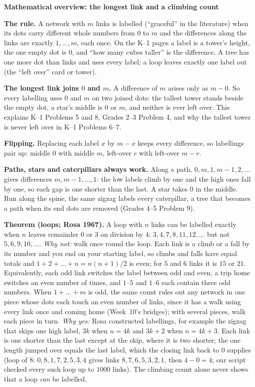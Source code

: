 \documentclass[11pt]{article}
\newcommand{\head}[1]{\par\textbf{\large #1}\par}
\begin{document}
\head{Mathematical overview: the longest link and a climbing count}
\textbf{The rule.} A network with $m$ links is labelled (``graceful'' in the literature) when its dots carry different whole numbers from $0$ to $m$ and the differences along the links are exactly $1,\dots,m$, each once. On the K--1 pages a label is a tower's height, the one empty dot is $0$, and ``how many cubes taller'' is the difference. A tree has one more dot than links and uses every label; a loop leaves exactly one label out (the ``left over'' card or tower).

\textbf{The longest link joins $0$ and $m$.} A difference of $m$ arises only as $m-0$. So every labelling uses $0$ and $m$ on two joined dots: the tallest tower stands beside the empty dot, a star's middle is $0$ or $m$, and neither is ever left over. This explains K--1 Problems 5 and 8, Grades 2--3 Problem 4, and why the tallest tower is never left over in K--1 Problems 6--7.

\textbf{Flipping.} Replacing each label $x$ by $m-x$ keeps every difference, so labellings pair up: middle $0$ with middle $m$, left-over $r$ with left-over $m-r$.

\textbf{Paths, stars and caterpillars always work.} Along a path, $0,m,1,m-1,2,\dots$ gives differences $m,m-1,\dots,1$: the low labels climb by one and the high ones fall by one, so each gap is one shorter than the last. A star takes $0$ in the middle. Run along the spine, the same zigzag labels every caterpillar, a tree that becomes a path when its end dots are removed (Grades 4--5 Problem 9).

\textbf{Theorem (loops; Rosa 1967).} A loop with $n$ links can be labelled exactly when $n$ leaves remainder $0$ or $3$ on division by $4$: $3,4,7,8,11,12,\dots$ but not $5,6,9,10,\dots$. \emph{Why not:} walk once round the loop. Each link is a climb or a fall by its number and you end on your starting label, so climbs and falls have equal totals and $1+2+\dots+n=n(n+1)/2$ is even; for $5$ and $6$ links it is $15$ or $21$. Equivalently, each odd link switches the label between odd and even, a trip home switches an even number of times, and $1$--$5$ and $1$--$6$ each contain three odd numbers. When $1+\dots+m$ is odd, the same count rules out any network in one piece whose dots each touch an even number of links, since it has a walk using every link once and coming home (Week~10's bridges); with several pieces, walk each piece in turn. \emph{Why yes:} Rosa constructed labellings, for example the zigzag that skips one high label, $3k$ when $n=4k$ and $3k+2$ when $n=4k+3$. Each link is one shorter than the last except at the skip, where it is two shorter; the one length jumped over equals the last label, which the closing link back to $0$ supplies (loop of $8$: $0,8,1,7,2,5,3,4$ gives links $8,7,6,5,3,2,1$, then $4-0=4$; our script checked every such loop up to $1000$ links). The climbing count alone never shows that a loop \emph{can} be labelled.
\end{document}
